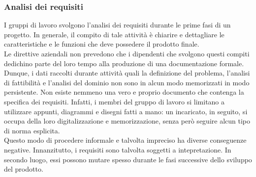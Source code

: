 			\subsubsection{Analisi dei requisiti}
				I gruppi di lavoro svolgono l'analisi dei requisiti durante le prime fasi di un progetto. In generale, il compito di
				tale attività è chiarire e dettagliare le caratteristiche e le funzioni che deve possedere il prodotto
				finale.\\
				Le direttive aziendali non prevedono che i dipendenti che svolgono questi compiti dedichino parte del loro tempo alla
				produzione di una documentazione formale. Dunque, i dati raccolti durante attività quali la definizione del
				problema, l'analisi di fattibilità e l'analisi del dominio non sono in alcun modo memorizzati in modo persistente.
				Non esiste nemmeno una vero e proprio documento che contenga la specifica dei requisiti. Infatti, i membri del
				gruppo di lavoro si limitano a utilizzare appunti, diagrammi e disegni fatti a mano: un incaricato, in seguito, si
				occupa della loro digitalizzazione e memorizzazione, senza però seguire alcun tipo di norma esplicita.\\
				Questo modo di procedere informale e talvolta impreciso ha diverse conseguenze negative. Innanzitutto, i requisiti
				sono  talvolta soggetti a intepretazione. In secondo luogo, essi possono mutare spesso durante le fasi successive
				dello sviluppo del prodotto.
